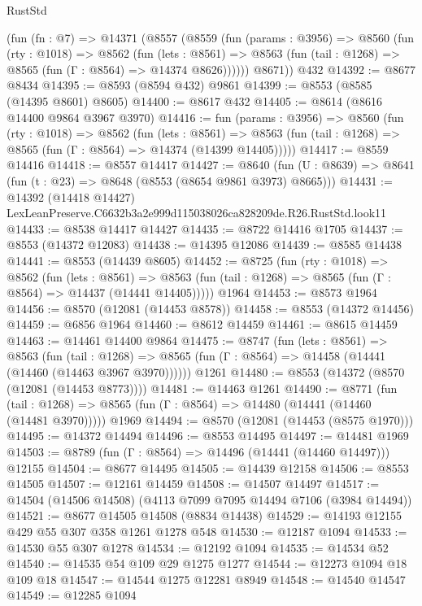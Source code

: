 \begin{lexlean}{RustStd}
\begin{coremodule}
    (fun (fn : @7) =>
    @14371
      (@8557
        (@8559
          (fun (params : @3956) =>
          @8560
            (fun (rty : @1018) =>
            @8562
              (fun (lets : @8561) =>
              @8563 (fun (tail : @1268) => @8565 (fun (Γ : @8564) => @14374 @8626))))))
        @8671))
    @432
@14392 := @8677 @8434
@14395 := @8593 (@8594 @432) @9861
@14399 := @8553 (@8585 (@14395 @8601) @8605)
@14400 := @8617 @432
@14405 := @8614 (@8616 @14400 @9864 @3967 @3970)
@14416 := fun (params : @3956) =>
  @8560
    (fun (rty : @1018) =>
    @8562
      (fun (lets : @8561) =>
      @8563 (fun (tail : @1268) => @8565 (fun (Γ : @8564) => @14374 (@14399 @14405)))))
@14417 := @8559 @14416
@14418 := @8557 @14417
@14427 := @8640
    (fun (U : @8639) => @8641 (fun (t : @23) => @8648 (@8553 (@8654 @9861 @3973) @8665)))
@14431 := @14392
    (@14418 @14427)
    LexLeanPreserve.C6632b3a2e999d115038026ca828209de.R26.RustStd.look11
@14433 := @8538 @14417 @14427
@14435 := @8722 @14416 @1705
@14437 := @8553 (@14372 @12083)
@14438 := @14395 @12086
@14439 := @8585 @14438
@14441 := @8553 (@14439 @8605)
@14452 := @8725
    (fun (rty : @1018) =>
    @8562
      (fun (lets : @8561) =>
      @8563 (fun (tail : @1268) => @8565 (fun (Γ : @8564) => @14437 (@14441 @14405)))))
    @1964
@14453 := @8573 @1964
@14456 := @8570 (@12081 (@14453 @8578))
@14458 := @8553 (@14372 @14456)
@14459 := @6856 @1964
@14460 := @8612 @14459
@14461 := @8615 @14459
@14463 := @14461 @14400 @9864
@14475 := @8747
    (fun (lets : @8561) =>
    @8563
      (fun (tail : @1268) =>
      @8565 (fun (Γ : @8564) => @14458 (@14441 (@14460 (@14463 @3967 @3970))))))
    @1261
@14480 := @8553 (@14372 (@8570 (@12081 (@14453 @8773))))
@14481 := @14463 @1261
@14490 := @8771
    (fun (tail : @1268) => @8565 (fun (Γ : @8564) => @14480 (@14441 (@14460 (@14481 @3970)))))
    @1969
@14494 := @8570 (@12081 (@14453 (@8575 @1970)))
@14495 := @14372 @14494
@14496 := @8553 @14495
@14497 := @14481 @1969
@14503 := @8789 (fun (Γ : @8564) => @14496 (@14441 (@14460 @14497))) @12155
@14504 := @8677 @14495
@14505 := @14439 @12158
@14506 := @8553 @14505
@14507 := @12161 @14459
@14508 := @14507 @14497
@14517 := @14504 (@14506 @14508) (@4113 @7099 @7095 @14494 @7106 (@3984 @14494))
@14521 := @8677 @14505 @14508 (@8834 @14438)
@14529 := @14193 @12155 @429 @55 @307 @358 @1261 @1278 @548
@14530 := @12187 @1094
@14533 := @14530 @55 @307 @1278
@14534 := @12192 @1094
@14535 := @14534 @52
@14540 := @14535 @54 @109 @29 @1275 @1277
@14544 := @12273 @1094 @18 @109 @18
@14547 := @14544 @1275 @12281 @8949
@14548 := @14540 @14547
@14549 := @12285 @1094

\end{coremodule}
\end{lexlean}
